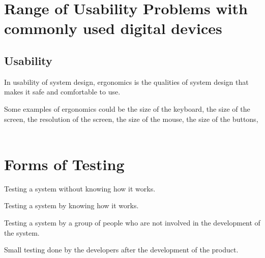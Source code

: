 \documentclass[12pt,fleqn]{book} %
\begin{document}
\section{Range of Usability Problems with commonly used digital devices}

\subsection{Usability}
\begin{definition}[Effectiveness]
\end{definition}\par

\begin{definition}[Effiency]
\end{definition}\par

\begin{definition}[Ergonomics]
  In usability of system design, ergonomics is the qualities of system design 
  that makes it safe and comfortable to use.
\end{definition}\par
Some examples of ergonomics could be the size of the keyboard, the size of the 
screen, the resolution of the screen, the size of the mouse, the size of the 
buttons, 

\begin{align*}
\end{align*}

\begin{definition}[Accessibility]
\end{definition}\par

\section{Forms of Testing}
\begin{definition}
  Testing a system without knowing how it works.
\end{definition}\par
\begin{definition}
  Testing a system by knowing how it works.
\end{definition}\par
\begin{definition}
  Testing a system by a group of people who are not involved in the development 
  of the system.
\end{definition}\par
\begin{definition}
  Small testing done by the developers after the development 
  of the product.
\end{definition}\par
\end{document}

